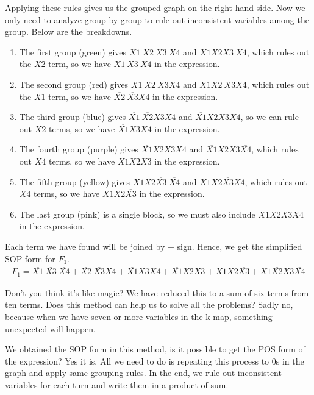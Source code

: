\begin{example}
		Applying these rules gives us the grouped graph on the right-hand-side. Now we only need to analyze group by group to rule out inconsistent variables among the group. Below are the breakdowns.
		
		\begin{enumerate}
			\item The first group (green) gives $\overline{X1}\ \overline{X2}\ \overline{X3}\ \overline{X4}$ and $\overline{X1}{X2}\overline{X3}\ \overline{X4}$, which rules out the $X2$ term, so we have $\overline{X1}\ \overline{X3}\ \overline{X4}$ in the expression.
			\item The second group (red) gives $\overline{X1}\ \overline{X2}\ \overline{X3}{X4}$ and ${X1}\overline{X2}\ \overline{X3}{X4}$, which rules out the $X1$ term, so we have $\overline{X2}\ \overline{X3}{X4}$ in the expression.
			\item The third group (blue) gives  $\overline{X1}\ \overline{X2}{X3}{X4}$ and $\overline{X1}{X2}{X3}{X4}$, so we can rule out $X2$ terms, so we have $\overline{X1}{X3}{X4}$ in the expression.
			\item The fourth group (purple) gives $\overline{X1}{X2}{X3}{X4}$ and $\overline{X1}{X2}{X3}\overline{X4}$, which rules out $X4$ terms, so we have $\overline{X1}{X2}{X3}$ in the expression.
			\item The fifth group (yellow) gives ${X1}{X2}\overline{X3}\ \overline{X4}$ and ${X1}{X2}\overline{X3}{X4}$, which rules out $X4$ terms, so we have ${X1}{X2}\overline{X3}$ in the expression.
			\item The last group (pink) is a single block, so we must also include ${X1}\overline{X2}{X3}\overline{X4}$ in the expression.
		\end{enumerate}
		Each term we have found will be joined by + sign. Hence, we get the simplified SOP form for $F_1$.
		\begin{align*}
			F_1=\overline{X1}\ \overline{X3}\ \overline{X4}+\overline{X2}\ \overline{X3}{X4}+ \overline{X1}{X3}{X4}+\overline{X1}{X2}{X3}+{X1}{X2}\overline{X3}+{X1}\overline{X2}{X3}\overline{X4}
		\end{align*}
		
	\end{example}
	Don't you think it's like magic? We have reduced this to a sum of six terms from ten terms. Does this method can help us to solve all the problems? Sadly no, because when we have seven or more variables in the k-map, something unexpected will happen.
	
	We obtained the SOP form in this method, is it possible to get the POS form of the expression? Yes it is. All we need to do is repeating this process to 0s in the graph and apply same grouping rules. In the end, we rule out inconsistent variables for each turn and write them in a product of sum.
	
